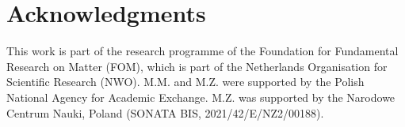 \documentclass[a4paper,10pt]{article}
\begin{document}
\section*{Acknowledgments}
This work is part of the research programme of the Foundation for Fundamental Research on Matter (FOM), 
which is part of the Netherlands Organisation for Scientific Research (NWO). M.M. and M.Z. were supported by the Polish National Agency for Academic Exchange. M.Z. was supported by the Narodowe Centrum Nauki, Poland (SONATA BIS, 2021/42/E/NZ2/00188).




\end{document}
